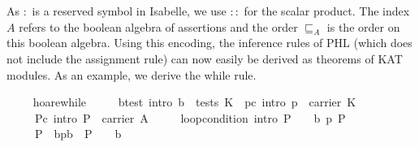 \documentclass{llncs}
\begin{document}
As $:$ is a reserved symbol in Isabelle, we use $::$ for the scalar
product. The index $A$ refers to the boolean algebra of assertions and
the order $\sqsubseteq_A$ is the order on this boolean algebra. Using
this encoding, the inference rules of PHL (which does not include the
assignment rule) can now easily be derived as theorems of KAT
modules. As an example, we derive the while rule.

\begin{isabellebody}
\isanewline
\ \ \ \isamarkupfalse%
\ hoare{}while{}\isanewline
\ \ \ \ \ b{}test\ {}intro{}{}\ {}b\ {}\ tests\ K{}\ \ pc\ {}intro{}{}\ {}p\ {}\ carrier\ K{}\isanewline
\ \ \ \ \ Pc\ {}intro{}{}\ {}P\ {}\ carrier\ A{}\isanewline
\ \ \ \ \ loop{}condition\ {}intro{}{}\ {}P\ {}\ {}{}\ {}\ b{}\ {}p{}\ P{}\isanewline
\ \ \ \ \ {}P\ {}\ {}b{}p{}b\ {}\ P\ {}\ {}{}\ {}\ {}b{}{}\isanewline

\end{isabellebody}
\end{document}
